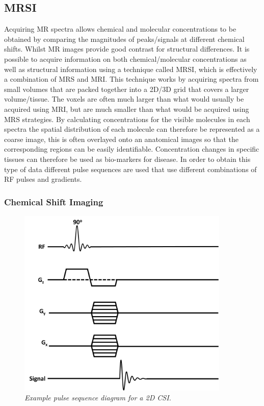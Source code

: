 \subsection{MRSI}

Acquiring MR spectra allows chemical and molecular concentrations to be obtained by comparing the magnitudes of peaks/signals at different chemical shifts. Whilst MR images provide good contrast for structural differences. It is possible to acquire information on both chemical/molecular concentrations as well as structural information using a technique called \ac{MRSI}, which is effectively a combination of \ac{MRS} and MRI. This technique works by acquiring spectra from small volumes that are packed together into a 2D/3D grid that covers a larger volume/tissue. The voxels are often much larger than what would usually be acquired using \ac{MRI}, but are much smaller than what would be acquired using \ac{MRS} strategies. By calculating concentrations for the visible molecules in each spectra the spatial distribution of each molecule can therefore be represented as a coarse image, this is often overlayed onto an anatomical images so that the corresponding regions can be easily identifiable. Concentration changes in specific tissues can therefore be used as bio-markers for disease. In order to obtain this type of data different pulse sequences are used that use different combinations of \ac{RF} pulses and gradients. 

\subsubsection{Chemical Shift Imaging}

\begin{figure}[h]
    \centering
    \includegraphics[width=0.9\textwidth]{Figures/Theory/CSI_sequence.png}
    \caption{\textit{Example pulse sequence diagram for a 2D \ac{CSI}.}}
    \label{fig:theory:CSI}
\end{figure}

